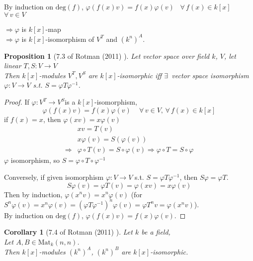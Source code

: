 \documentclass[10pt]{amsart}
\newtheorem{corollary}{Corollary}
\newtheorem{proposition}{Proposition}
\begin{document}
\begin{multicols*}{2}
\begin{enumerate}
	By induction on $\text{deg}(f)$, $\varphi(f(x)v) = f(x) \varphi(v)$ \quad \, $\forall \, f(x) \in k[x]$ \quad \, $\forall \, v \in V$ 
	
	$\Longrightarrow \varphi$ is $k[x]$-map \\
	$\Longrightarrow \varphi$ is $k[x]$-isomorphism of $V^T$ and $(k^n)^A$.  
	
\end{enumerate}


\begin{proposition}[7.3 of Rotman (2011) \cite{JRotman2010}]\label{Prop:kxmoduleisomorphism}
	Let vector space over field $k$, $V$, let linear $T,S : V \to V$ \\
	Then $k[x]$-modules $V^T, V^S$ are $k[x]$-isomorphic iff $\exists \, $ vector space isomorphism $\varphi : V \to V$ s.t. $S = \varphi T \varphi^{-1}$.  
\end{proposition}

\begin{proof}
	If $\varphi:V^T \to V^S$is a $k[x]$-isomorphism, 
	\[
	\varphi(f(x)v) = f(x)\varphi(v) \quad \, \forall \, v \in V , \, \forall \, f(x) \in k[x]
	\]
	if $f(x)=x$, then $\varphi(xv) = x\varphi(v)$
	\[
	\begin{aligned}
	& xv = T(v) \\ 
	& x\varphi(v) = S(\varphi(v)) \\ 
	\Longrightarrow & \varphi \circ T(v) = S \circ \varphi(v) \Longrightarrow \varphi \circ T = S \circ \varphi 
	\end{aligned}
	\]
	$\varphi$ isomorphism, so $S = \varphi \circ T \circ \varphi^{-1}$
	
	Conversely, if given isomorphism $\varphi: V \to V$ s.t. $S = \varphi T \varphi^{-1}$, then $S\varphi = \varphi T$.  
	\[
	S\varphi(v) = \varphi T(v) = \varphi(xv) = x\varphi(v)
	\]
	Then by induction, $\varphi(x^nv) = x^n\varphi(v)$ (for $S^n\varphi(v) = x^n\varphi(v) = (\varphi T \varphi^{-1})^n \varphi(v) = \varphi T^n v = \varphi(x^nv)$).  \\
	By induction on $\text{deg}(f)$, $\varphi(f(x)v) = f(x)\varphi(v)$.  
	
	
\end{proof}



\begin{corollary}[7.4 of Rotman (2011) \cite{JRotman2010}] 
	Let $k$ be a field, \\
	Let $A,B \in \text{Mat}_k(n,n)$.  \\
	Then $k[x]$-modules $(k^n)^A$, $(k^n)^B$ are $k[x]$-isomorphic.  
	

\end{corollary}
\end{multicols*}
\end{document}
